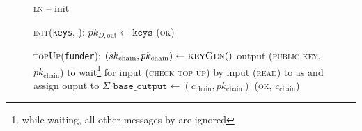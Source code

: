 \begin{figure}[H]
  \begin{processbox}{\textsc{ln} -- init}
    \begin{algorithmic}[1]
      \State \textsc{init}(\texttt{keys}, \dave):
      \Indent
        \State $pk_{D, \mathrm{out}} \gets \texttt{keys}$
        \State \Return (\textsc{ok})
      \EndIndent
      \Statex

      \State \textsc{topUp}(\texttt{funder}): 
      \Indent
        \State $(sk_{\mathrm{chain}}, pk_{\mathrm{chain}}) \gets
        \textsc{keyGen}()$
        \State output (\textsc{public key}, $pk_{\mathrm{chain}}$) to \dave
          \State wait\footnote{while waiting, all other messages by \dave are
          ignored} for input (\textsc{check top up}) by \dave
          \State input (\textsc{read}) to \ledger as \dave and assign ouput to
          $\Sigma$
        \EndWhile
        \State $\texttt{base\_output} \gets (c_{\mathrm{chain}},
        pk_{\mathrm{chain}})$
        \State \Return (\textsc{ok}, $c_{\mathrm{chain}}$)
      \EndIndent
    \end{algorithmic}
  \end{processbox}
  \caption{}
  \label{code:ln:init}
\end{figure}


